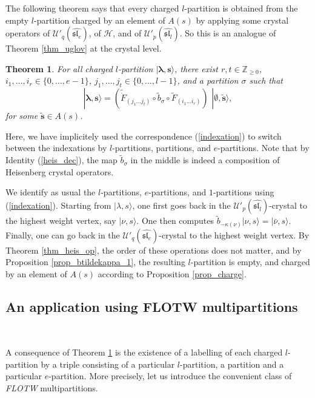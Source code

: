 \documentclass[twoside,12pt]{amsart}
\theoremstyle{plain}
\newcommand{\cH}{\mathcal{H}}
\newcommand{\Z}{\mathbb{Z}}
\newcommand{\bs}{\mathbf{s}}
\newcommand{\si}{\sigma}
\newcommand{\la}{\lambda}
\newcommand{\ka}{\kappa}
\newcommand{\bla}{\boldsymbol{\la}}
\newcommand{\tb}{\tilde{b}}
\newcommand{\tF}{\tilde{F}}
\newcommand{\tdF}{\tilde{\dot{F}}}
\newcommand{\tbs}{\tilde{\bs}}
\newcommand{\Ue}{\mathcal{U}'_q (\widehat{\mathfrak{sl}_e})}
\newcommand{\Ul}{\mathcal{U}'_p (\widehat{\mathfrak{sl}_l})}
\newcommand{\bemp}{\boldsymbol{\emptyset}}
\newtheorem{thm}[num]{Theorem}
\theoremstyle{remark}
\begin{document}
The following theorem says that every charged $l$-partition 
is obtained from the empty $l$-partition charged by an element of $A(s)$
by applying some crystal operators of $\Ue$, of $\cH$, and of $\Ul$.
So this is an analogue of Theorem \ref{thm_uglov} at the crystal level.

\begin{thm}\label{thm_crys_decomp}
For all charged $l$-partition $|\bla,\bs\rangle$, there exist $r,t\in\Z_{\geq0}$,
$i_1,\dots,i_r\in\{0,\dots,e-1\}$, $j_1,\dots,j_t\in\{0,\dots,l-1\}$,
and a partition $\si$ such that
$$|\bla,\bs\rangle = (\tdF_{(j_1 \dots j_t)} \circ \tb_{\si} \circ \tF_{(i_1 \dots i_r)}) \, \, |\bemp,\tbs\rangle,
$$
for some $\tbs\in A(s)$.
\end{thm}

Here, we have implicitely used the correspondence (\ref{indexation})
to switch between the indexations by $l$-partitions, partitions, and $e$-partitions.
Note that by Identity (\ref{heis_dec}), the map $\tb_{\si}$ in the middle is indeed a composition of
Heisenberg crystal operators.

\proof We identify as usual the $l$-partitions, $e$-partitions, and $1$-partitions using (\ref{indexation}).
Starting from $|\la,s\rangle$, one first goes
back in the $\Ul$-crystal to the highest weight vertex, say $|\nu,s\rangle$.
One then computes $\tb_{-\ka(\nu)}|\nu,s\rangle=|\bar{\nu},s\rangle$.
Finally, one can go back in the $\Ue$-crystal to the highest weight vertex.
By Theorem \ref{thm_heis_op}, the order of these operations does not matter,
and by Proposition \ref{prop_btildekappa_1}, the resulting $l$-partition is empty,
and charged by an element of $A(s)$ according to Proposition \ref{prop_charge}.
\endproof



\subsection{An application using FLOTW multipartitions}\label{flotw}\

A consequence of Theorem \ref{thm_crys_decomp} is the existence of a labelling
of each charged $l$-partition by a triple consisting of 
a particular $l$-partition, a partition and a particular $e$-partition.
More precisely, let us introduce the convenient class of \textit{FLOTW} multipartitions.
\end{document}
